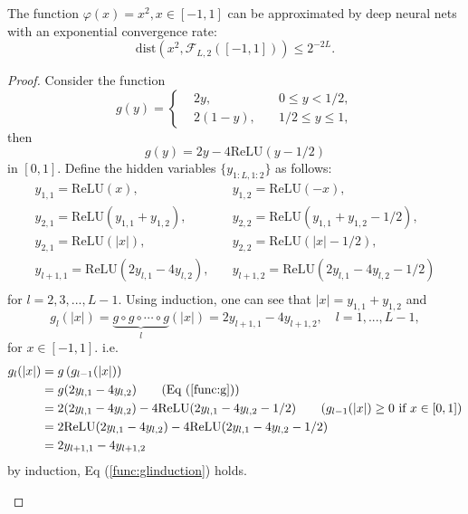 \begin{lemma}\label{lem:xsquare}
The function $\varphi(x) = x^2,x\in [-1,1]$ can be approximated by deep neural nets with an exponential convergence rate:
$$
\mbox{dist}(x^2,\mathcal{F}_{L,2}([-1,1]))\le 2^{-2L}.
$$
\end{lemma}
\begin{proof}
Consider the function
$$
g(y) = \left\{\begin{split}
	&2y,&\quad 0\le y<1/2,\\
	&2(1-y),&\quad 1/2\le y\le 1,
	\end{split}\right.
$$
then 
\begin{equation}\label{func:g}
g(y) = 2y -4\mbox{ReLU}(y-1/2)
\end{equation}
in $[0,1]$. Define the hidden variables $\{y_{1:L,1:2}\}$ as follows:
\[
\begin{split}
 y_{1,1} = \mbox{ReLU}(x),&\quad y_{1,2}=\mbox{ReLU}(-x),\\
 y_{2,1} = \mbox{ReLU}(y_{1,1}+y_{1,2}),&\quad y_{2,2} = \mbox{ReLU}(y_{1,1}+y_{1,2}-1/2),\\
 y_{2,1} = \mbox{ReLU}(|x|),&\quad y_{2,2} = \mbox{ReLU}(|x|-1/2),\\
 y_{l+1,1} = \mbox{ReLU}(2y_{l,1}-4y_{l,2}),&\quad y_{l+1,2} = \mbox{ReLU}(2y_{l,1}-4y_{l,2}-1/2)\\
\end{split}
\]
for $l = 2,3,...,L-1$. Using induction, one can see that $|x| = y_{1,1}+y_{1,2}$ and 
\begin{equation}\label{func:glinduction}
g_l(|x|)=\underbrace{g\circ g\circ \cdots \circ g}_{l}(|x|) = 2y_{l+1,1}-4y_{l+1,2},\quad l=1,...,L-1,
\end{equation} 
for $x\in [-1,1]$. i.e.
\[
\begin{split}
g_l(|x|) &= g\left(g_{l-1}(|x|)\right)\\
         &= g(2y_{l,1}-4y_{l,2})\qquad (\mbox{Eq~(\ref{func:g})})\\
         &= 2(2y_{l,1}-4y_{l,2}) - 4\mbox{ReLU}(2y_{l,1}-4y_{l,2}-1/2)\qquad (g_{l-1}(|x|)\ge 0~\mbox{if}~x\in[0,1])\\
         &= 2\mbox{ReLU}(2y_{l,1}-4y_{l,2})- 4\mbox{ReLU}(2y_{l,1}-4y_{l,2}-1/2)\\
         & = 2y_{l+1,1} - 4y_{l+1,2}\\
\end{split}
\]
by induction, Eq (\ref{func:glinduction}) holds.
\begin{figure}[h]
	\centering

\end{figure}
\end{proof}
